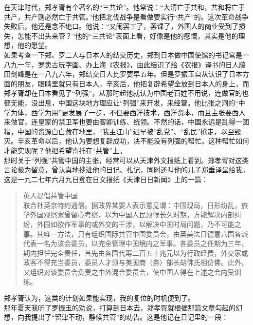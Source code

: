 在天津时代，郑孝胥有个著名的“三共论”。他常说：“大清亡于共和，共和将亡于共产，共产则必然亡于共管。”他把北伐战争是看做要实行“共产”的。这次革命战争失败后，他还是念不绝口。他说：“又闹罢工了，罢课了，外国人的商业受到了损失，怎能不出头来管？”他的“三共论”表面上看，好像是他的感慨，其实是他的理想，他的愿望。\\

如果考查一下郑、罗二人与日本人的结交历史，郑到日本做中国使馆的书记宫是一八九一年，罗卖古玩字画、办上海《农报》，由此结识了给《农报》译书的日人藤田剑峰是在一八九六年，郑结交日人比罗要早五年。但是罗振玉自从认识了日本方面的朋友，眼睛里就只有日本人，辛亥后，他把复辟希望全放到日本人的身上，而郑孝胥却在日本看见了“列强”，从那时起他就认为中国老百姓不用说，连做官的也都无能，没出息，中国这块地方理应让“列强”来开发，来经营。他比张之洞的“中学为体，西学为用”更发展了一步，不但要西洋技术，西洋资本，而且主张要西人来做官，连皇家的禁卫军也要由客卿训练、统领。不然的话，中国永远是乱得一团糟，中国的资源白白藏在地里，“我主江山”迟早被“乱党”、“乱民”抢走，以至毁灭。辛亥革命以后，他认为要想复辟成功，决不能没有列强的帮忙。这种帮忙如何才能实现呢？他把希望寄托在“共管”上。\\

那时关于“列强”共管中国的主张，经常可以从天津外文报纸上看到。郑孝胥对这类言论极为留意，曾认真地抄进他的日记、札记，同时还叫他的儿子郑垂译呈给我。这是一九二七年六月九日登在日文报纸《天津日日新闻》上的一篇：\\

\begin{quote}
	英人提倡共管中国\\

联合社英京特约通信。据政界某要人表示意见谓：中国现局，日形纷乱，旅华外国观察家曾留心考察，以为中国人民须候长久时期，方能解决内部纠纷，外国如欲作军事的或外交的干涉，以解决中国时局问题，乃不可能之事。其唯一方法，只有组织国际共管中国委员会，由英美法日德意六国各派代表一名为该会委员，以完全管理中国境内之军事。各委员之任期为三年，期内担任完全责任，首先由各国代筹二百五十兆元以为行政经费，外交家或政客不得充当委员，委员人才须与美国商（务）部长胡佛氏相仿佛。此外，又组织对该委员会负责之中外混合委员会，使中国人得在上述之会内受训练。\\
\end{quote}

郑孝胥认为，这类的计划如果能实现，我的复位的时机便到了。\\

那年夏天我听了罗振玉的劝说，打算到日本去，郑孝胥就根据那篇文章勾起的幻想，向我提出了“留津不动，静候共管”的劝告。这是他记在日记里的一段：\\


